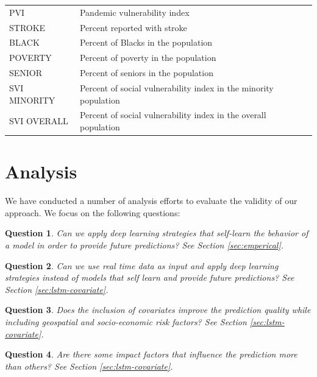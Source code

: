 \documentclass[a4paper, inpress]{jds} %
\renewcommand{\_}{%
    \textunderscore\hspace{0pt}%
}
\newtheorem{question}{Question}
\begin{document}
\begin{table}[!hptb]
{\begin{tabular}{ll}
 PVI 		  & Pandemic vulnerability index \\
 STROKE 	  & Percent reported with stroke\\
 BLACK	  & Percent of Blacks in the population\\
 POVERTY & Percent of poverty in the population\\
 SENIOR  & Percent of seniors in the population\\
 SVI\_MINORITY 	  & Percent of social vulnerability index in the minority population\\
 SVI\_OVERALL 	  & Percent of social vulnerability index in the overall population\\
\bottomrule
\end{tabular}
}
\end{table}


\section{Analysis}

We have conducted a number of analysis efforts to evaluate the validity of our approach. We focus on the following questions:

\begin{question} \normalfont Can we apply deep learning strategies that self-learn the behavior of a model in order to provide future predictions? See Section \ref{sec:emperical}.
\label{q:1}
\end{question}

\begin{question} \normalfont Can we use real time data as input and apply deep learning strategies instead of models that self learn and provide future predictions? See Section \ref{sec:lstm-covariate}.
\label{q:2}
\end{question}

\begin{question} \normalfont Does the inclusion of covariates improve the prediction quality while including geospatial and socio-economic risk factors? See Section \ref{sec:lstm-covariate}.
\label{q:3}
\end{question}

\begin{question} \normalfont Are there some impact factors that influence the prediction more than others? See Section \ref{sec:lstm-covariate}.
\label{q:4}
\end{question}

\end{document}
